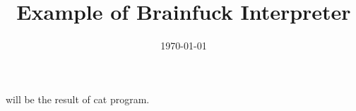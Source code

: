 \documentclass{article}
\title{Example of Brainfuck Interpreter}
\date{\today}
\begin{document}
\maketitle
\cite{code} will be the result of cat program.
\nocite{*}


\end{document}
